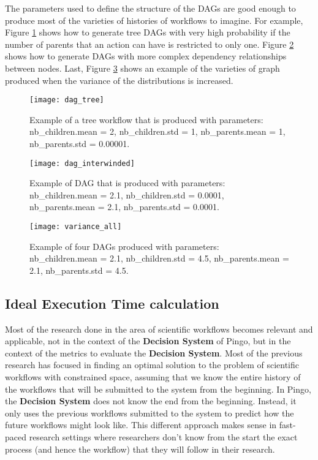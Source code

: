 The parameters used to define the structure of the DAGs are good enough to produce most of the varieties of histories of workflows to imagine. For example, Figure \ref{fig:dag_tree} shows how to generate tree DAGs with very high probability if the number of parents that an action can have is restricted to only one.  Figure \ref{fig:dag_complex} shows how to generate DAGs with more complex dependency relationships between nodes.  Last, Figure \ref{fig:dag_variety} shows an example of the varieties of graph produced when the variance of the distributions is increased.
\begin{figure}
\centering
\texttt{[image: dag\_tree]}
\caption{Example of a tree workflow that is produced with parameters: nb\_children.mean = 2, nb\_children.std =  1, nb\_parents.mean = 1, nb\_parents.std = 0.00001.}
\label{fig:dag_tree}
\end{figure}
\begin{figure}
\centering
\texttt{[image: dag\_interwinded]}
\caption{Example of DAG that is produced with parameters: nb\_children.mean = 2.1, nb\_children.std = 0.0001, nb\_parents.mean = 2.1, nb\_parents.std = 0.0001.}
\label{fig:dag_complex}
\end{figure}

\begin{figure}
\centering
\texttt{[image: variance\_all]}
\caption{Example of four DAGs produced with parameters: nb\_children.mean = 2.1, nb\_children.std = 4.5, nb\_parents.mean = 2.1, nb\_parents.std = 4.5.}
\label{fig:dag_variety}
\end{figure}


\subsection{Ideal Execution Time calculation}
Most of the research done in the area of scientific workflows becomes relevant and applicable, not in the context of the \textbf{Decision System} of Pingo, but in the context of the metrics to evaluate the \textbf{Decision System}.  Most of the previous research has focused in finding an optimal solution to the problem of scientific workflows with constrained space, assuming that we know the entire history of the workflows that will be submitted to the system from the beginning.  In Pingo, the \textbf{Decision System} does not know the end from the beginning.  Instead, it only uses the previous workflows submitted to the system to predict how the future workflows might look like.  This different approach makes sense in fast-paced research settings where researchers don't know from the start the exact process (and hence the workflow) that they will follow in their research.

